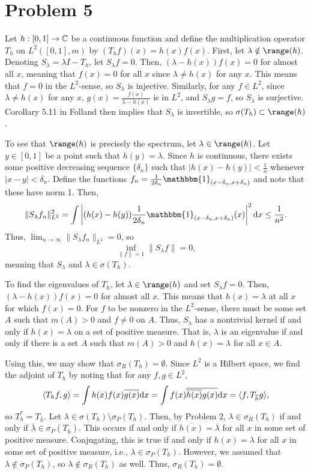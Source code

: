 \documentclass{article}
\begin{document}
\section{Problem 5}
Let $h:[0,1]\to\mathbb{C}$ be a continuous function and define the multiplication operator $T_h$ on $L^2([0,1],m)$ by $(T_hf)(x)=h(x)f(x)$. First, let $\lambda\notin\range(h)$. Denoting $S_\lambda=\lambda I-T_h$, let $S_\lambda f=0$. Then, $(\lambda-h(x))f(x)=0$ for almost all $x$, meaning that $f(x)=0$ for all $x$ since $\lambda\neq h(x)$ for any $x$. This means that $f=0$ in the $L^2$-sense, so $S_\lambda$ is injective. Similarly, for any $f\in L^2$, since $\lambda\neq h(x)$ for any $x$, $g(x)=\frac{f(x)}{\lambda-h(x)}$ is in $L^2$, and $S_\lambda g=f$, so $S_\lambda$ is surjective. Corollary 5.11 in Folland then implies that $S_\lambda$ is invertible, so $\sigma(T_h)\subset\range(h)$. 

To see that $\range(h)$ is precisely the spectrum, let $\lambda\in\range(h)$. Let $y\in[0,1]$ be a point such that $h(y)=\lambda$. Since $h$ is continuous, there exists some positive decreasing sequence $\{\delta_n\}$ such that $|h(x)-h(y)|<\frac{1}{n}$ whenever $|x-y|<\delta_n$. Define the functions $f_n=\frac{1}{2\delta_n}\mathbbm{1}_{(x-\delta_n,x+\delta_n)}$ and note that these have norm 1. Then,
\[
\|S_\lambda f_n\|_{L^2}^2=\int \left|(h(x)-h(y))\frac{1}{2\delta_n}\mathbbm{1}_{(x-\delta_n,x+\delta_n)}(x)\right|^2\df x\leq\frac{1}{n^2}.
\]
Thus, $\lim_{n\to\infty}\|S_\lambda f_n\|_{L^2}=0$, so 
\[
\inf_{\|f\|=1}\|S_\lambda f\|=0,
\]
meaning that $S_\lambda$ and $\lambda\in\sigma(T_h)$. 

To find the eigenvalues of $T_h$, let $\lambda\in\range(h)$ and set $S_\lambda f=0$. Then, $(\lambda-h(x))f(x)=0$ for almost all $x$. This means that $h(x)=\lambda$ at all $x$ for which $f(x)=0$. For $f$ to be nonzero in the $L^2$-sense, there must be some set $A$ such that $m(A)>0$ and $f\neq 0$ on $A$. Thus, $S_\lambda$ has a nontrivial kernel if and only if $h(x)=\lambda$ on a set of positive measure. That is, $\lambda$ is an eigenvalue if and only if there is a set $A$ such that $m(A)>0$ and $h(x)=\lambda$ for all $x\in A$. 

Using this, we may show that $\sigma_R(T_h)=\emptyset$. Since $L^2$ is a Hilbert space, we find the adjoint of $T_h$ by noting that for any $f,g\in L^2$,
\[
\langle T_h f,g\rangle=\int h(x)f(x)\overline{g(x)}\mathrm{d} x=\int f(x)\overline{\overline{h(x)}g(x)}\mathrm{d} x=\langle f,T_{\overline{h}}g\rangle,
\]
so $T_h^*=T_{\overline{h}}$. Let $\lambda\in \sigma(T_h)\setminus\sigma_P(T_h)$. Then, by Problem 2, $\lambda\in\sigma_R(T_h)$ if and only if $\overline{\lambda}\in \sigma_P(T_{\overline{h}})$. This occurs if and only if $\overline{h(x)}=\overline{\lambda}$ for all $x$ in some set of positive measure. Conjugating, this is true if and only if $h(x)=\lambda$ for all $x$ in some set of positive measure, i.e., $\lambda\in\sigma_P(T_h)$. However, we assumed that $\lambda\notin\sigma_P(T_h)$, so $\lambda\notin\sigma_R(T_h)$ as well. Thus, $\sigma_R(T_h)=\emptyset$.
\end{document}
